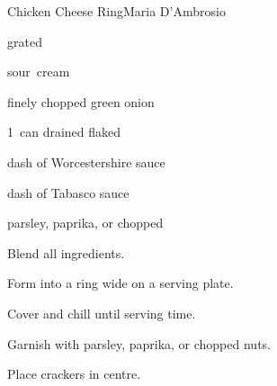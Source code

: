 \begin{recipe}{Chicken Cheese Ring}{Maria D'Ambrosio}{}

\begin{ingredients}
\item {} 
\item {} grated 
\item \C{\quarter} sour~cream
\item \C{\quarter} finely chopped green onion
\item 1~can drained flaked 
\item dash of Worcestershire sauce
\item dash of Tabasco sauce
\item parsley, paprika, or chopped 
\end{ingredients}

\begin{directions}
\item Blend all ingredients.
\item Form into a ring  wide on a serving plate.
\item Cover and chill until serving time.
\item Garnish with parsley, paprika, or chopped nuts.
\item Place crackers in centre.
\end{directions}

\end{recipe}
